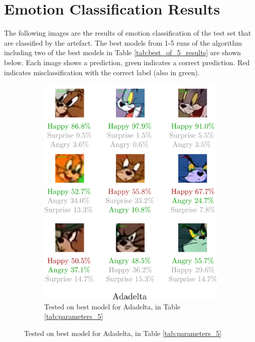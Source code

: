 \documentclass[report, 11pt, oneside]{dissertation}
\begin{document}
\chapter{Emotion Classification Results}
\label{appendix:D}

The following images are the results of emotion classification of the test set that are classified by the artefact. The best models from 1-5 runs of the algorithm including two of the best models in Table \ref{tab:best_of_5_results} are shown below. Each image shows a prediction, green indicates a correct prediction. Red indicates misclassification with the correct label (also in green). 
\\

\begin{figure}[h]
	\begin{subfigure}{0.54\textwidth}
		\includegraphics[scale=0.125]{figure_36.pdf}
		\caption{\tiny{Tested on best model for Adadelta, in Table \ref{tab:parameters_5}}}
	\end{subfigure}
	\label{fig:emotion_classification_adadelta}

\end{figure}
\end{document}
